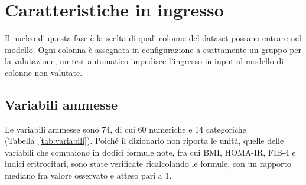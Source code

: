 \documentclass[a4paper, 12pt, oneside]{book}
\begin{document}
\section{Caratteristiche in ingresso}

Il nucleo di questa fase è la scelta di quali colonne del dataset possano entrare nel modello. Ogni colonna è assegnata in configurazione a esattamente un gruppo per la valutazione, un test automatico impedisce l'ingresso in input al modello di colonne non valutate.

\subsection{Variabili ammesse}

Le variabili ammesse sono 74, di cui 60 numeriche e 14 categoriche (Tabella~\ref{tab:variabili}). Poiché il dizionario non riporta le unità, quelle delle variabili che compaiono in dodici formule note, fra cui BMI, HOMA-IR, FIB-4 e indici eritrocitari, sono state verificate ricalcolando le formule, con un rapporto mediano fra valore osservato e atteso pari a 1.
\end{document}
